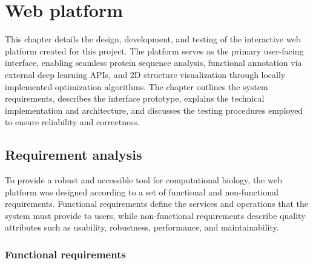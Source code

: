 \chapter{Web platform}
\label{cap3}

This chapter details the design, development, and testing of the interactive web platform created for this project. The platform serves as the primary user-facing interface, enabling seamless protein sequence analysis, functional annotation via external deep learning APIs, and 2D structure visualization through locally implemented optimization algorithms. The chapter outlines the system requirements, describes the interface prototype, explains the technical implementation and architecture, and discusses the testing procedures employed to ensure reliability and correctness.

\section{Requirement analysis}
\label{cap3:sec_requirements}

To provide a robust and accessible tool for computational biology, the web platform was designed according to a set of functional and non-functional requirements. Functional requirements define the services and operations that the system must provide to users, while non-functional requirements describe quality attributes such as usability, robustness, performance, and maintainability.

\subsection{Functional requirements}
\label{cap3:subsec_functional_requirements}

